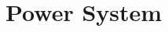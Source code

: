 \documentclass[../main]{subfiles}
\begin{document}
\chapter{Power System} \label{chp:}






\end{document}
